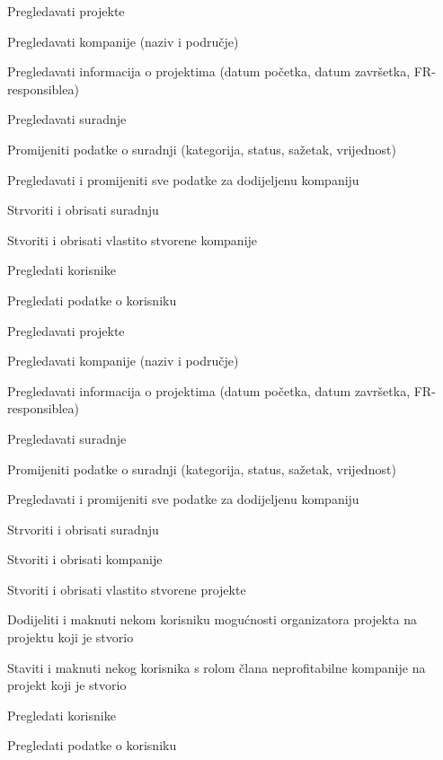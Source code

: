 \begin{packed_enum}
\begin{packed_enum}
				\end{packed_enum}

				\item  {}

				\begin{packed_enum}

					\item Pregledavati projekte
					\item Pregledavati kompanije (naziv i područje)
					\item Pregledavati informacija o projektima (datum početka, datum završetka, FR- responsiblea)
					\item Pregledavati suradnje
					\item Promijeniti podatke o suradnji (kategorija, status, sažetak, vrijednost)
					\item Pregledavati i promijeniti sve podatke za dodijeljenu kompaniju
					\item Strvoriti i obrisati suradnju
					\item Stvoriti i obrisati vlastito stvorene kompanije
					\item Pregledati korisnike
					\item Pregledati podatke o korisniku

				\end{packed_enum}

				\item  {}

				\begin{packed_enum}

					\item Pregledavati projekte
					\item Pregledavati kompanije (naziv i područje)
					\item Pregledavati informacija o projektima (datum početka, datum završetka, FR- responsiblea)
					\item Pregledavati suradnje
					\item Promijeniti podatke o suradnji (kategorija, status, sažetak, vrijednost)
					\item Pregledavati i promijeniti sve podatke za dodijeljenu kompaniju
					\item Strvoriti i obrisati suradnju
					\item Stvoriti i obrisati kompanije
					\item Stvoriti i obrisati vlastito stvorene projekte
					\item Dodijeliti i maknuti nekom korisniku mogućnosti organizatora projekta na projektu koji je stvorio
					\item Staviti i maknuti nekog korisnika s rolom člana neprofitabilne kompanije na projekt koji je stvorio
					\item Pregledati korisnike
					\item Pregledati podatke o korisniku


\end{packed_enum}
\end{packed_enum}
